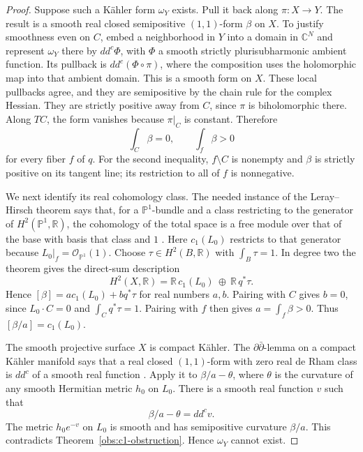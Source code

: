 \documentclass[11pt,a4paper]{article}
\numberwithin{equation}{section}
\theoremstyle{definition}
\theoremstyle{remark}
\newcommand{\C}{\mathbb C}
\newcommand{\R}{\mathbb R}
\renewcommand{\P}{\mathbb P}
\newcommand{\OO}{\mathcal O}
\newcommand{\ddc}{dd^{c}}
\newcommand{\cOne}{c_1}
\begin{document}
\begin{proof}
Suppose such a K\"ahler form $\omega_Y$ exists. Pull it back along
$\pi:X\to Y$. The result is a smooth real closed semipositive
$(1,1)$-form $\beta$ on $X$. To justify smoothness even on $C$,
embed a neighborhood in $Y$ into a domain in $\C^N$ and represent
$\omega_Y$ there by $\ddc\Phi$, with $\Phi$ a smooth strictly
plurisubharmonic ambient function. Its pullback is
$\ddc(\Phi\circ\pi)$, where the composition uses the holomorphic
map into that ambient domain. This is a smooth form on $X$.
These local pullbacks agree, and they are semipositive by the
chain rule for the complex Hessian. They are strictly positive
away from $C$, since $\pi$ is biholomorphic there. Along $TC$,
the form vanishes because $\pi|_C$ is constant. Therefore
\begin{equation}\label{con:beta-intersections}
                    \int_C\beta=0,\qquad \int_f\beta>0
\end{equation}
for every fiber $f$ of $q$. For the second inequality, $f\setminus C$
is nonempty and $\beta$ is strictly positive on its tangent line;
its restriction to all of $f$ is nonnegative.

We next identify its real cohomology class. The needed instance
of the Leray--Hirsch theorem says that, for a $\P^1$-bundle and
a class restricting to the generator of $H^2(\P^1,\R)$,
the cohomology of the total space is a free module over that of
the base with basis that class and $1$
\cite[Theorem 5.11]{BottTu1982}. Here $\cOne(L_0)$ restricts to
that generator because $L_0|_f=\OO_{\P^1}(1)$.
Choose $\tau\in H^2(B,\R)$ with $\int_B\tau=1$. In degree two
the theorem gives the direct-sum description
\[
 H^2(X,\R)=
        \R\,\cOne(L_0)\ \oplus\ \R\,q^*\tau .
\]
Hence $[\beta]=a\cOne(L_0)+bq^*\tau$ for real numbers $a,b$.
Pairing with $C$ gives $b=0$, since
$L_0\cdot C=0$ and $\int_Cq^*\tau=1$. Pairing with $f$ then
gives $a=\int_f\beta>0$. Thus
$[\beta/a]=\cOne(L_0)$.

The smooth projective surface $X$ is compact K\"ahler.
The $\partial\bar\partial$-lemma on a compact K\"ahler manifold
says that a real closed $(1,1)$-form with zero real de Rham
class is $\ddc$ of a smooth real function
\cite[Chapter VI, Lemma 8.6]{DemaillyCADG}.
Apply it to $\beta/a-\theta$, where $\theta$ is the curvature
of any smooth Hermitian metric $h_0$ on $L_0$. There is a smooth
real function $v$ such that
\[
                    \beta/a-\theta=\ddc v .
\]
The metric $h_0e^{-v}$ on $L_0$ is smooth and has semipositive
curvature $\beta/a$. This contradicts
Theorem~\ref{obs:c1-obstruction}. Hence $\omega_Y$ cannot exist.
\end{proof}
\end{document}
